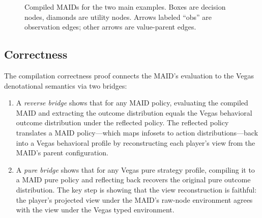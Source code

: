 \documentclass[11pt]{article}
\begin{document}
\begin{figure}[ht]
\centering
{}
\caption{Compiled MAIDs for the two main examples. Boxes are decision
nodes, diamonds are utility nodes. Arrows labeled ``obs'' are observation
edges; other arrows are value-parent edges.}\label{fig:maid-mp}
\end{figure}


\subsection{Correctness}\label{sec:maid-correct}

The compilation correctness proof connects the MAID's evaluation to the
Vegas denotational semantics via two bridges:

\begin{enumerate}[nosep]
\item A \emph{reverse bridge} shows that for any MAID policy, evaluating the
      compiled MAID and extracting the outcome distribution equals the Vegas
      behavioral outcome distribution under the reflected policy. The
      reflected policy translates a MAID policy---which maps infosets to action
      distributions---back into a Vegas behavioral profile by reconstructing
      each player's view from the MAID's parent configuration.

\item A \emph{pure bridge} shows that for any Vegas pure strategy profile,
      compiling it to a MAID pure policy and reflecting back recovers the
      original pure outcome distribution. The key step is showing that the
      view reconstruction is faithful: the player's projected view under the
      MAID's raw-node environment agrees with the view under the Vegas
      typed environment.
\end{enumerate}
\end{document}
